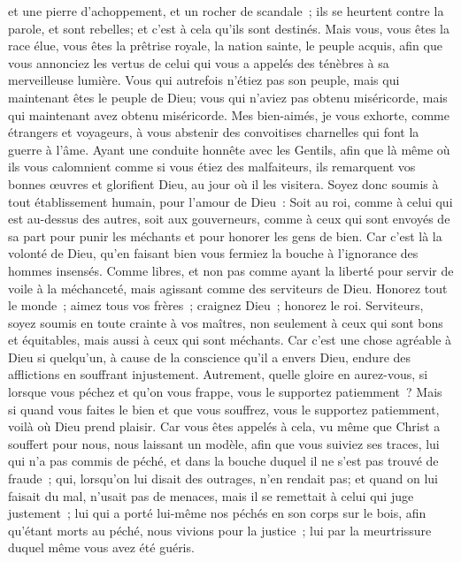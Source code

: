 \begin{multicols}{2}
et une pierre d'achoppement, et un rocher de scandale~; ils se heurtent contre la parole, et sont rebelles; et c'est à cela qu'ils sont destinés.
Mais vous, vous êtes la race élue, vous êtes la prêtrise royale, la nation sainte, le peuple acquis, afin que vous annonciez les vertus de celui qui vous a appelés des ténèbres à sa merveilleuse lumière.
Vous qui autrefois n'étiez pas son peuple, mais qui maintenant êtes le peuple de Dieu; vous qui n'aviez pas obtenu miséricorde, mais qui maintenant avez obtenu miséricorde.
Mes bien-aimés, je vous exhorte, comme étrangers et voyageurs, à vous abstenir des convoitises charnelles qui font la guerre à l'âme.
Ayant une conduite honnête avec les Gentils, afin que là même où ils vous calomnient comme si vous étiez des malfaiteurs, ils remarquent vos bonnes œuvres et glorifient Dieu, au jour où il les visitera.
Soyez donc soumis à tout établissement humain, pour l'amour de Dieu~: Soit au roi, comme à celui qui est au-dessus des autres,
soit aux gouverneurs, comme à ceux qui sont envoyés de sa part pour punir les méchants et pour honorer les gens de bien.
Car c'est là la volonté de Dieu, qu'en faisant bien vous fermiez la bouche à l'ignorance des hommes insensés.
Comme libres, et non pas comme ayant la liberté pour servir de voile à la méchanceté, mais agissant comme des serviteurs de Dieu.
Honorez tout le monde~; aimez tous vos frères~; craignez Dieu~; honorez le roi.
Serviteurs, soyez soumis en toute crainte à vos maîtres, non seulement à ceux qui sont bons et équitables, mais aussi à ceux qui sont méchants.
Car c'est une chose agréable à Dieu si quelqu'un, à cause de la conscience qu'il a envers Dieu, endure des afflictions en souffrant injustement. 
Autrement, quelle gloire en aurez-vous, si lorsque vous péchez et qu'on vous frappe, vous le supportez patiemment~? Mais si quand vous faites le bien et que vous souffrez, vous le supportez patiemment, voilà où Dieu prend plaisir. 
Car vous êtes appelés à cela, vu même que Christ a souffert pour nous, nous laissant un modèle, afin que vous suiviez ses traces, 
lui qui n'a pas commis de péché, et dans la bouche duquel il ne s'est pas trouvé de fraude~;
qui, lorsqu'on lui disait des outrages, n'en rendait pas; et quand on lui faisait du mal, n'usait pas de menaces, mais il se remettait à celui qui juge justement~; 
lui qui a porté lui-même nos péchés en son corps sur le bois, afin qu'étant morts au péché, nous vivions pour la justice~; lui par la meurtrissure duquel même vous avez été guéris.

\end{multicols}
